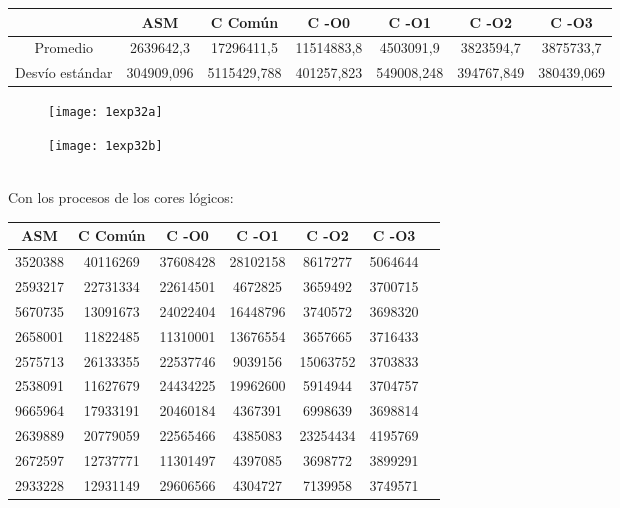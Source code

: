 ﻿\documentclass[a4paper]{article}
\begin{document}
\begin{center}
  \begin{tabular}{| c | c | c | c | c | c | c |}
    \hline
      & ASM & C Com\'un& C -O0 & C -O1 & C -O2 & C -O3 \\
      \hline\hline
      Promedio	& 2639642,3 &17296411,5 & 11514883,8  &4503091,9 &3823594,7 &3875733,7\\
      \hline
      Desvío estándar & 304909,096 &5115429,788  &401257,823  &549008,248 &394767,849  &380439,069\\
      \hline
  \end{tabular}
\end{center}


\begin{figure}[h]
  \centering
    \texttt{[image: 1exp32a]}
\end{figure}


\begin{figure}[h]
  \centering
    \texttt{[image: 1exp32b]}
\end{figure}


\ \\
Con los procesos de los cores l\'ogicos:
\ \\
\begin{center}
  \begin{tabular}{| c | c | c | c | c | c | c |}
    \hline
    ASM & C Com\'un &C -O0 & C -O1 & C -O2 & C -O3\\ 
    \hline\hline
    3520388 &40116269  &37608428  &28102158  &8617277 &5064644\\
    \hline
    2593217 &22731334  &22614501 &4672825& 3659492 &3700715\\
    \hline
    5670735 &13091673  &24022404 &16448796  &3740572 &3698320\\
    \hline
    2658001 &11822485  &11310001 &13676554  &3657665 &3716433\\
    \hline
    2575713 &26133355  &22537746 &9039156 &15063752 & 3703833\\
    \hline
    2538091 &11627679  &24434225 &19962600  &5914944 &3704757\\
    \hline
    9665964 &17933191  &20460184 &4367391 &6998639& 3698814\\
    \hline
    2639889 &20779059  &22565466 &4385083 &23254434 & 4195769\\
    \hline
    2672597 &12737771  &11301497 &4397085 &3698772 &3899291\\
    \hline
    2933228 &12931149  &29606566 &4304727 &7139958 &3749571\\
    \hline

    \hline
  \end{tabular}
\end{center}
\end{document}
